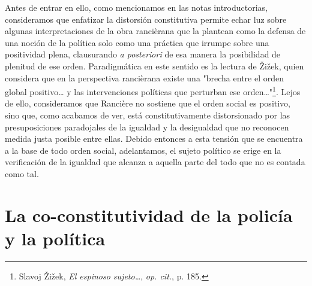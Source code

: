 Antes de entrar en ello, como mencionamos en las notas introductorias,
consideramos que enfatizar la distorsión constitutiva permite echar luz
sobre algunas interpretaciones de la obra rancièrana que la plantean
como la defensa de una noción de la política solo como una práctica que
irrumpe sobre una positividad plena, clausurando \emph{a posteriori} de
esa manera la posibilidad de plenitud de ese orden. Paradigmática en
este sentido es la lectura de Žižek, quien considera que en la
perspectiva rancièrana existe una "brecha entre el orden global
positivo\ldots{} y las intervenciones políticas que perturban ese
orden\ldots"\footnote{Slavoj Žižek, \emph{El espinoso sujeto\ldots{}},
  \emph{op. cit.}, p. 185.}. Lejos de ello, consideramos que Rancière no
sostiene que el orden social es positivo, sino que, como acabamos de
ver, está constitutivamente distorsionado por las presuposiciones
paradojales de la igualdad y la desigualdad que no reconocen medida
justa posible entre ellas. Debido entonces a esta tensión que se
encuentra a la base de todo orden social, adelantamos, el sujeto
político se erige en la verificación de la igualdad que alcanza a
aquella parte del todo que no es contada como tal.

\section{La co-constitutividad de la policía y la política}

